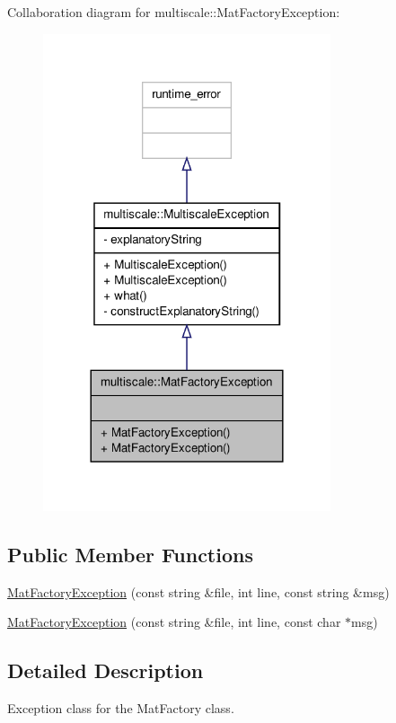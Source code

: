 Collaboration diagram for multiscale\-:\-:Mat\-Factory\-Exception\-:\nopagebreak
\begin{figure}[H]
\begin{center}
\leavevmode
\includegraphics[width=240pt]{classmultiscale_1_1MatFactoryException__coll__graph}
\end{center}
\end{figure}
\subsection*{Public Member Functions}
\begin{DoxyCompactItemize}
\item 
\hyperlink{classmultiscale_1_1MatFactoryException_ac22ebdceb46a147d167419cd5c8bdad3}{Mat\-Factory\-Exception} (const string \&file, int line, const string \&msg)
\item 
\hyperlink{classmultiscale_1_1MatFactoryException_af164ffc6645f2584c5ecfd16980b1cc5}{Mat\-Factory\-Exception} (const string \&file, int line, const char $\ast$msg)
\end{DoxyCompactItemize}


\subsection{Detailed Description}
Exception class for the Mat\-Factory class. 

